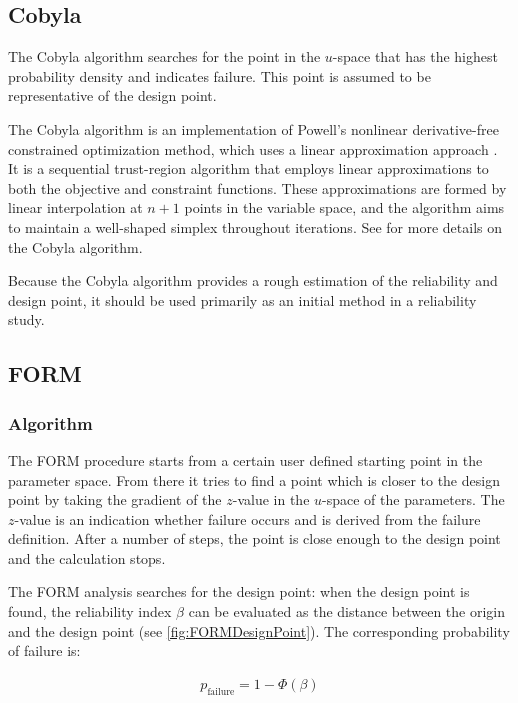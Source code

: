 {\subsection{Cobyla}
\label{sec:Cobyla}

The Cobyla algorithm searches for the point in the $u$-space that has the highest probability density and indicates failure.
This point is assumed to be representative of the design point.

The Cobyla algorithm is an implementation of Powell's nonlinear derivative-free constrained optimization method,
which uses a linear approximation approach \cite{Powell1994}.
It is a sequential trust-region algorithm that employs linear approximations to both the objective and constraint functions.
These approximations are formed by linear interpolation at $n + 1$ points in the variable space,
and the algorithm aims to maintain a well-shaped simplex throughout iterations.
See \cite{scientific_background_optimization} for more details on the Cobyla algorithm.

Because the Cobyla algorithm provides a rough estimation of the reliability and design point, it should be used primarily as an initial method in a reliability study.

\newpage
\subsection{FORM}
\label{sec:FORM}

\subsubsection{Algorithm}

The FORM procedure starts from a certain user defined starting point in the parameter space. From there it tries to find a point which is closer to the design point by taking the gradient of the $z$-value in the $u$-space of the parameters. The $z$-value is an indication whether failure occurs and is derived from the failure definition. After a number of steps, the point is close enough to the design point and the calculation stops. 

The FORM analysis searches for the design point: when the design point is found, the reliability index $\beta$ can be evaluated as the distance between the origin and the design point (see \autoref{fig:FORMDesignPoint}). The corresponding probability of failure is:

\begin{align}
p_\text{failure} = 1 - \Phi \left(\beta\right)
\end{align}

}
